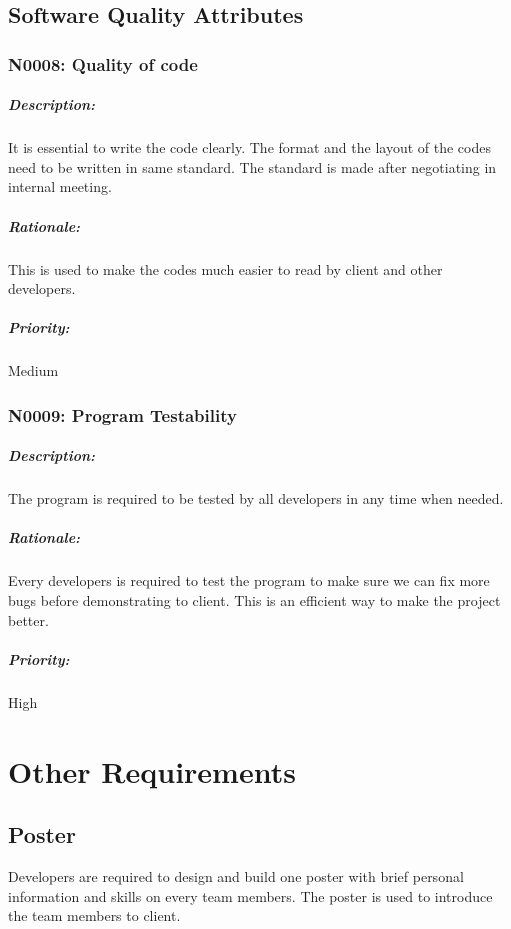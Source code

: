 \documentclass[11pt, a4paper]{report}
\begin{document}
\section{Software Quality Attributes}
\subsection{N0008: Quality of code}
\paragraph{Description:}
It is essential to write the code clearly. The format and the layout of the codes need to be written in same standard. The standard is made after negotiating in internal meeting.
\paragraph{Rationale:}
This is used to make the codes much easier to read by client and other developers.
\paragraph{Priority:}
Medium

\subsection{N0009: Program Testability}
\paragraph{Description:}
The program is required to be tested by all developers in any time when needed. 
\paragraph{Rationale:}
Every developers is required to test the program to make sure we can fix more bugs before demonstrating to client. This is an efficient way to make the project better.
\paragraph{Priority:}
High

\chapter{Other Requirements}
\section{Poster}
Developers are required to design and build one poster with brief personal information and skills on every team members. The poster is used to introduce the team members to client.
\end{document}
